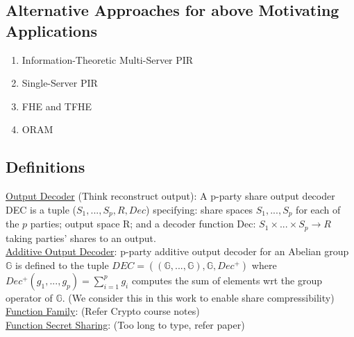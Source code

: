 \subsection{Alternative Approaches for above Motivating Applications}
\begin{enumerate}
    \item Information-Theoretic Multi-Server PIR
    \item Single-Server PIR
    \item FHE and TFHE
    \item ORAM
\end{enumerate}

\subsection{Definitions}
\underline{Output Decoder} (Think reconstruct output): A p-party share output decoder DEC is a tuple ($S_1, ..., S_p, R, Dec$) specifying: share spaces $S_1, ..., S_p$ for each of the $p$ parties; output space R; and a decoder function Dec: $S_1 \times ... \times S_p \rightarrow R$ taking parties' shares to an output.\\

\noindent \underline{Additive Output Decoder}: p-party additive output decoder for an Abelian group $\mathbb{G}$ is defined to the tuple $DEC = ((\mathbb{G}, ..., \mathbb{G}), \mathbb{G}, Dec^+)$ where $Dec^+(g_1, ..., g_p) = \sum_{i=1}^pg_i$ computes the sum of elements wrt the group operator of $\mathbb{G}$. (We consider this in this work to enable share compressibility)\\

\noindent \underline{Function Family}: (Refer Crypto course notes) \\

\noindent \underline{Function Secret Sharing}: (Too long to type, refer paper) \\

